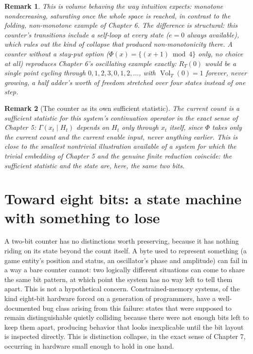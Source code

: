 \documentclass[11pt]{report}
\newtheorem{remark}{Remark}[chapter]
\begin{document}
\begin{remark}
This is volume behaving the way intuition expects: monotone
nondecreasing, saturating once the whole space is reached, in
contrast to the folding, non-monotone example of Chapter 6. The
difference is structural: this counter's transitions include a
self-loop at every state ($e=0$ always available), which rules out the
kind of collapse that produced non-monotonicity there. A counter
\emph{without} a stay-put option ($\Phi(x) = \{(x+1) \bmod 4\}$ only,
no choice at all) reproduces Chapter 6's oscillating example exactly:
$R_T(0)$ would be a single point cycling through $0,1,2,3,0,1,2,\dots$,
with $\operatorname{Vol}_T(0) = 1$ forever, never growing, a half
adder's worth of freedom stretched over four states instead of one
step.
\end{remark}

\begin{remark}[The counter as its own sufficient statistic]
The current count is a sufficient statistic for this system's
continuation operator in the exact sense of Chapter 5: $\Gamma(x_t \mid
H_t)$ depends on $H_t$ only through $x_t$ itself, since $\Phi$ takes
only the current count and the current enable input, never anything
earlier. This is close to the smallest nontrivial illustration
available of a system for which the trivial embedding of Chapter 5 and
the genuine finite reduction coincide: the sufficient statistic and the
state are, here, the same two bits.
\end{remark}

\section*{Toward eight bits: a state machine with something to lose}

A two-bit counter has no distinctions worth preserving, because it has
nothing riding on its state beyond the count itself. A byte used to
represent something (a game entity's position and status, an
oscillator's phase and amplitude) can fail in a way a bare counter
cannot: two logically different situations can come to share the same
bit pattern, at which point the system has no way left to tell them
apart. This is not a hypothetical concern. Constrained-memory systems,
of the kind eight-bit hardware forced on a generation of
programmers, have a well-documented bug class arising from
this failure: states that were supposed to remain distinguishable
quietly colliding because there were not enough bits left to keep them
apart, producing behavior that looks inexplicable until the bit layout
is inspected directly. This is distinction collapse, in the exact
sense of Chapter 7, occurring in hardware small enough to hold in one
hand.
\end{document}
